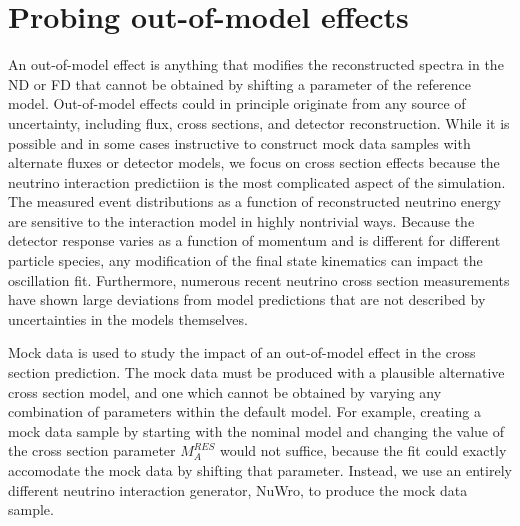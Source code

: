 \documentclass[11pt]{article}
\begin{document}
\section{Probing out-of-model effects}
\label{sec:mockdata}

An out-of-model effect is anything that modifies the reconstructed spectra in the ND or FD that cannot be obtained by shifting a parameter of the reference model. Out-of-model effects could in principle originate from any source of uncertainty, including flux, cross sections, and detector reconstruction. While it is possible and in some cases instructive to construct mock data samples with alternate fluxes or detector models, we focus on cross section effects because the neutrino interaction predictiion is the most complicated aspect of the simulation. The measured event distributions as a function of reconstructed neutrino energy are sensitive to the interaction model in highly nontrivial ways. Because the detector response varies as a function of momentum and is different for different particle species, any modification of the final state kinematics can impact the oscillation fit. Furthermore, numerous recent neutrino cross section measurements have shown large deviations from model predictions that are not described by uncertainties in the models themselves.
 
Mock data is used to study the impact of an out-of-model effect in the cross section prediction. The mock data must be produced with a plausible alternative cross section model, and one which cannot be obtained by varying any combination of parameters within the default model. For example, creating a mock data sample by starting with the nominal model and changing the value of the cross section parameter $M_{A}^{RES}$ would not suffice, because the fit could exactly accomodate the mock data by shifting that parameter. Instead, we use an entirely different neutrino interaction generator, NuWro, to produce the mock data sample.
\end{document}
